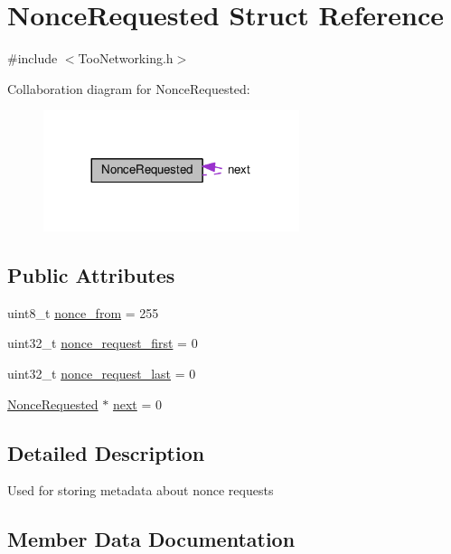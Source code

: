 \hypertarget{structNonceRequested}{}\section{Nonce\+Requested Struct Reference}
\label{structNonceRequested}


{\ttfamily \#include $<$Too\+Networking.\+h$>$}



Collaboration diagram for Nonce\+Requested\+:
\nopagebreak
\begin{figure}[H]
\begin{center}
\leavevmode
\includegraphics[width=212pt]{structNonceRequested__coll__graph}
\end{center}
\end{figure}
\subsection*{Public Attributes}
\begin{DoxyCompactItemize}
\item 
uint8\+\_\+t \hyperlink{structNonceRequested_a49d5f4e83fa72e51cc37237cc46f3a7e}{nonce\+\_\+from} = 255
\item 
uint32\+\_\+t \hyperlink{structNonceRequested_a9e2f47eec20e01c7cce1acf2d47bbf14}{nonce\+\_\+request\+\_\+first} = 0
\item 
uint32\+\_\+t \hyperlink{structNonceRequested_ae5453d115c1ba4044592921e0127f0c8}{nonce\+\_\+request\+\_\+last} = 0
\item 
\hyperlink{structNonceRequested}{Nonce\+Requested} $\ast$ \hyperlink{structNonceRequested_a2ef35667b6b2cb12f1c845ddc63f16ec}{next} = 0
\end{DoxyCompactItemize}


\subsection{Detailed Description}
Used for storing metadata about nonce requests 

\subsection{Member Data Documentation}
\mbox{\label{structNonceRequested_a2ef35667b6b2cb12f1c845ddc63f16ec}} 
